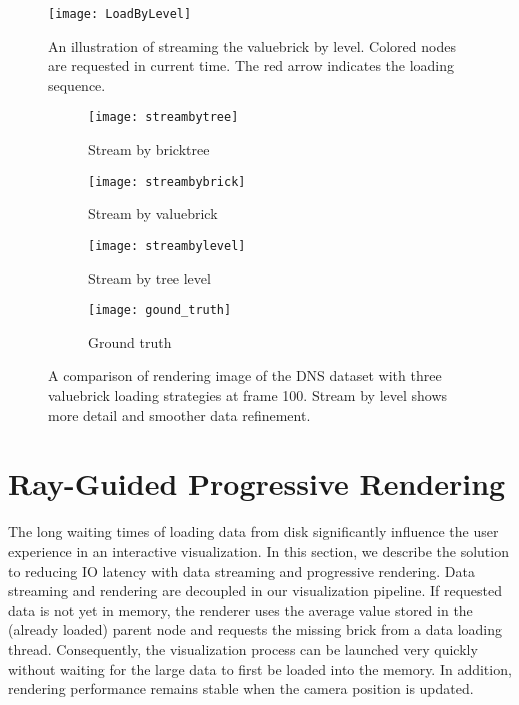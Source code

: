\begin{figure}[b]
  \centering
    \texttt{[image: LoadByLevel]}
    \caption{\label{fig:loadbylevel}An illustration of streaming the valuebrick by level. Colored nodes are requested in current time. The red arrow indicates the loading sequence.}
\end{figure}

\begin{figure*}[t]
    \centering
    \begin{subfigure}[b]{0.85\columnwidth}
        \texttt{[image: streambytree]}
        \vspace{-2em}
        \caption{Stream by bricktree}
        \label{fig:streambytree}
    \end{subfigure}
    \begin{subfigure}[b]{0.85\columnwidth}
        \texttt{[image: streambybrick]}
        \vspace{-2em}
        \caption{Stream by valuebrick}
        \label{fig:streambybrick}
    \end{subfigure}
    \begin{subfigure}[b]{0.85\columnwidth}
        \texttt{[image: streambylevel]}
        \vspace{-2em}
        \caption{Stream by tree level}
        \label{fig:streambylevel}
    \end{subfigure}
    \begin{subfigure}[b]{0.85\columnwidth}
        \texttt{[image: gound\_truth]}
        \vspace{-2em}
        \caption{Ground truth}
        \label{fig:streambylevel}
    \end{subfigure}
	\caption{\label{fig:streamstrategy}%
	A comparison of rendering image of the DNS dataset with three valuebrick loading strategies at frame 100. Stream by level shows more detail and smoother data refinement.}
	\vspace{-0.5em}
\end{figure*}


\section{Ray-Guided Progressive Rendering}
The long waiting times of loading data from disk significantly
influence the user experience in an interactive visualization. 
In this section, we describe the solution to reducing IO latency with data streaming and progressive rendering. 
Data streaming and rendering are decoupled in
our visualization pipeline. If requested data is not yet in memory, the renderer uses 
the average value stored in the (already loaded) parent node
and requests the missing brick from a data loading thread. Consequently,
the visualization process can be launched very quickly without waiting for the large
data to first be loaded into the memory. In addition, rendering performance remains stable 
when the camera position is updated. 



